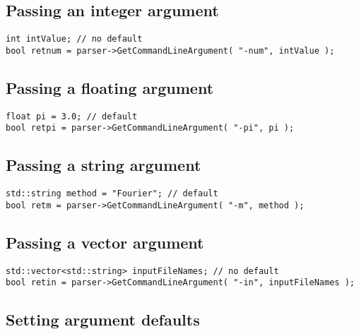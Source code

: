 \documentclass{InsightArticle}
\begin{document}
\subsection{Passing an integer argument}

\small{}\normalsize

\small
\begin{verbatim}
int intValue; // no default
bool retnum = parser->GetCommandLineArgument( "-num", intValue );
\end{verbatim}
\normalsize

\subsection{Passing a floating argument}

\small{}\normalsize

\small
\begin{verbatim}
float pi = 3.0; // default
bool retpi = parser->GetCommandLineArgument( "-pi", pi );
\end{verbatim}
\normalsize

\subsection{Passing a string argument}

\small{}\normalsize

\small
\begin{verbatim}
std::string method = "Fourier"; // default
bool retm = parser->GetCommandLineArgument( "-m", method );
\end{verbatim}
\normalsize

\subsection{Passing a vector argument}

\small{}\normalsize

\small
\begin{verbatim}
std::vector<std::string> inputFileNames; // no default
bool retin = parser->GetCommandLineArgument( "-in", inputFileNames );
\end{verbatim}
\normalsize

\subsection{Setting argument defaults}
\end{document}
